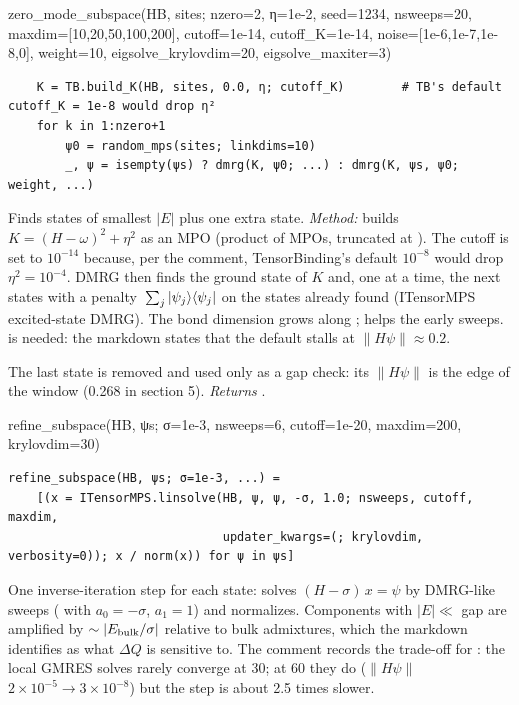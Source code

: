 \begin{function}{zero\_mode\_subspace(HB, sites; nzero=2, η=1e-2, seed=1234, nsweeps=20, maxdim=[10,20,50,100,200], cutoff=1e-14, cutoff\_K=1e-14, noise=[1e-6,1e-7,1e-8,0], weight=10, eigsolve\_krylovdim=20, eigsolve\_maxiter=3)}
\begin{Verbatim}
    K = TB.build_K(HB, sites, 0.0, η; cutoff_K)        # TB's default cutoff_K = 1e-8 would drop η²
    for k in 1:nzero+1
        ψ0 = random_mps(sites; linkdims=10)
        _, ψ = isempty(ψs) ? dmrg(K, ψ0; ...) : dmrg(K, ψs, ψ0; weight, ...)
\end{Verbatim}
Finds  states of smallest $|E|$ plus one extra state. \emph{Method:}  builds
$K = (H-\omega)^2 + \eta^2$ as an MPO (product of MPOs, truncated at ). The cutoff is set to $10^{-14}$ because, per the
comment, TensorBinding's default $10^{-8}$ would drop $\eta^2 = 10^{-4}$. DMRG then finds the ground state of $K$ and, one at a time, the
next states with a penalty $\,\sum_j|\psi_j\rangle\langle\psi_j|$ on the states already found (ITensorMPS excited-state DMRG). The
bond dimension grows along ;  helps the early sweeps.  is needed: the markdown
states that the default stalls at $\|H\psi\|\approx0.2$.

The last state is removed and used only as a gap check: its $\|H\psi\|$ is the edge of the window (0.268 in section 5).
\emph{Returns} .
\end{function}

\begin{function}{refine\_subspace(HB, ψs; σ=1e-3, nsweeps=6, cutoff=1e-20, maxdim=200, krylovdim=30)}
\begin{Verbatim}
refine_subspace(HB, ψs; σ=1e-3, ...) =
    [(x = ITensorMPS.linsolve(HB, ψ, ψ, -σ, 1.0; nsweeps, cutoff, maxdim,
                              updater_kwargs=(; krylovdim, verbosity=0)); x / norm(x)) for ψ in ψs]
\end{Verbatim}
One inverse-iteration step for each state: solves $(H - \sigma)\,x = \psi$ by DMRG-like sweeps ( with $a_0 = -\sigma$,
$a_1 = 1$) and normalizes. Components with $|E|\ll$ gap are amplified by $\sim|E_{\rm bulk}/\sigma|$ relative to bulk admixtures, which the
markdown identifies as what $\Delta Q$ is sensitive to. The comment records the trade-off for : the local GMRES solves rarely
converge at 30; at 60 they do ($\|H\psi\|$ $2\times10^{-5}\to3\times10^{-8}$) but the step is about 2.5 times slower.
\end{function}

